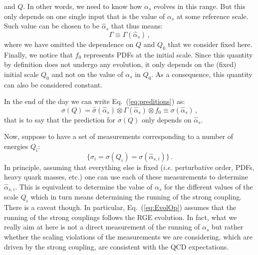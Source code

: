 \documentclass[10pt,a4paper]{article}
\begin{document}
and $Q$. In other words, we need to know how $\alpha_s$ evolves in
this range. But this only depends on one single input that is the
value of $\alpha_s$ at some reference scale. Such value can be chosen
to be $\hat\alpha_s$ that thus means:
\begin{equation}
\Gamma\equiv \Gamma(\hat\alpha_s)\,,
\end{equation}
where we have omitted the dependence on $Q$ and $Q_0$ that we consider
fixed here. Finally, we notice that $f_0$ represents PDFs at the
initial scale. Since this quantity by definition does not undergo any
evolution, it only depends on the (fixed) initial scale $Q_0$ and not
on the value of $\alpha_s$ in $Q_0$. As a consequence, this quantity
can also be considered constant.

In the end of the day we can write Eq.~(\ref{eq:preditions}) as:
\begin{equation}\label{eq:preditions1}
  \sigma(Q) = \hat{\sigma}(\hat\alpha_s)\otimes\Gamma(\hat\alpha_s)\otimes f_0\equiv\sigma(\hat\alpha_s)\,,
\end{equation}
that is to say that the prediction for $\sigma(Q)$ only depends on
$\hat\alpha_s$.

Now, suppose to have a set of measurements corresponding to a number
of energies $Q_i$:
\begin{equation}
  \{\sigma_i = \sigma(Q_i) = \sigma(\hat\alpha_{s,i})\}\,.
\end{equation}
In principle, assuming that everything else is fixed ($i.e.$
perturbative order, PDFs, heavy quark masses, etc.) one can use each
of these measurements to determine $\hat\alpha_{s,i}$. This is
equivalent to determine the value of $\alpha_s$ for the different
values of the scale $Q_i$ which in turn means determining the running
of the strong coupling. There is a caveat though. In particular,
Eq.~(\ref{eq:EvolOp}) assumes that the running of the strong couplings
follows the RGE evolution. In fact, what we really aim at here is not
a direct measurement of the running of $\alpha_s$ but rather whether
the scaling violations of the measurements we are considering, which
are driven by the strong coupling, are consistent with the QCD
expectations.
\end{document}
